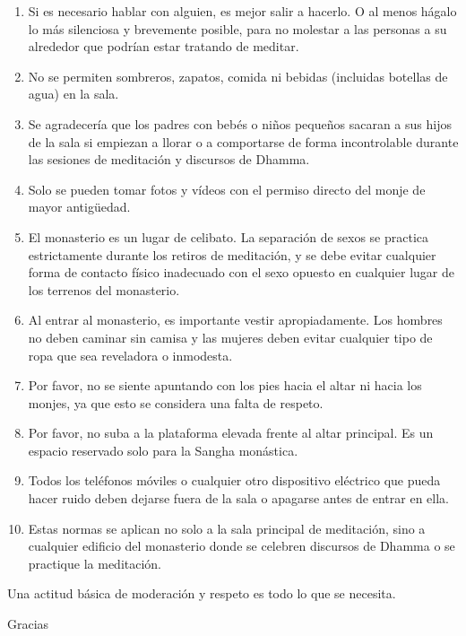 \begin{enumerate}
\item Si es necesario hablar con alguien, es mejor salir a hacerlo. O al menos hágalo lo más silenciosa y brevemente posible, para no molestar a las personas a su alrededor que podrían estar tratando de meditar.

\item No se permiten sombreros, zapatos, comida ni bebidas (incluidas botellas de agua) en la sala.

\item Se agradecería que los padres con bebés o niños pequeños sacaran a sus hijos de la sala si empiezan a llorar o a comportarse de forma incontrolable durante las sesiones de meditación y discursos de Dhamma.

\item Solo se pueden tomar fotos y vídeos con el permiso directo del monje de mayor antigüedad.

\item El monasterio es un lugar de celibato. La separación de sexos se practica estrictamente durante los retiros de meditación, y se debe evitar cualquier forma de contacto físico inadecuado con el sexo opuesto en cualquier lugar de los terrenos del monasterio.

\item Al entrar al monasterio, es importante vestir apropiadamente. Los hombres no deben caminar sin camisa y las mujeres deben evitar cualquier tipo de ropa que sea reveladora o inmodesta.

\item Por favor, no se siente apuntando con los pies hacia el altar ni hacia los monjes, ya que esto se considera una falta de respeto.

\item Por favor, no suba a la plataforma elevada frente al altar principal. Es un espacio reservado solo para la Sangha monástica.

\item Todos los teléfonos móviles o cualquier otro dispositivo eléctrico que pueda hacer ruido deben dejarse fuera de la sala o apagarse antes de entrar en ella.

\item Estas normas se aplican no solo a la sala principal de meditación, sino a cualquier edificio del monasterio donde se celebren discursos de Dhamma o se practique la meditación.
\end{enumerate}
Una actitud básica de moderación y respeto es todo lo que se necesita.

Gracias




